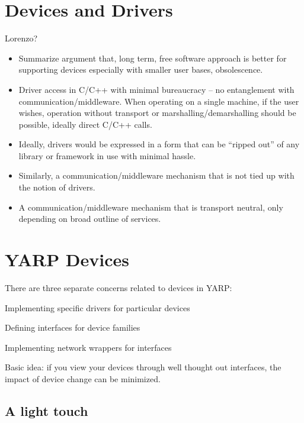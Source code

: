 

\section{Devices and Drivers}

Lorenzo?


\begin{itemize}


\item Summarize argument that, long term, free software approach 
is better for supporting devices especially with smaller user
bases, obsolescence.


\item Driver access in C/C++ with minimal bureaucracy -- no
entanglement with communication/middleware.  When operating
on a single machine, if the user wishes, operation without
transport or marshalling/demarshalling should be possible, ideally
direct C/C++ calls.

\item Ideally, drivers would be expressed in a form that
can be ``ripped out'' of any library or framework in use
with minimal hassle.

\item Similarly, a communication/middleware mechanism that is 
not tied up with the notion of drivers.

\item A communication/middleware mechanism that is transport
neutral, only depending on broad outline of services.


\end{itemize}




\section{YARP Devices}

There are three separate concerns related to devices in YARP:

Implementing specific drivers for particular devices 

Defining interfaces for device families 

Implementing network wrappers for interfaces

Basic idea: if you view your devices through well thought out
interfaces, the impact of device change can be minimized.


\subsection{A light touch}

